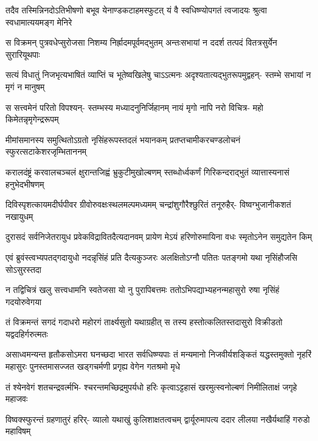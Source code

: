 \twolineshloka
{तदैव तस्मिन्निनदोऽतिभीषणो बभूव येनाण्डकटाहमस्फुटत्}
{यं वै स्वधिष्ण्योपगतं त्वजादयः श्रुत्वा स्वधामात्ययमङ्ग मेनिरे} %

\fourlineindentedshloka
{स विक्रमन् पुत्रवधेप्सुरोजसा}
{निशम्य निर्ह्रादमपूर्वमद्भुतम्}
{अन्तःसभायां न ददर्श तत्पदं}
{वितत्रसुर्येन सुरारियूथपाः} %

\fourlineindentedshloka
{सत्यं विधातुं निजभृत्यभाषितं}
{व्याप्तिं च भूतेष्वखिलेषु चाऽऽत्मनः}
{अदृश्यतात्यद्भुतरूपमुद्वहन्-}
{स्तम्भे सभायां न मृगं न मानुषम्} %

\fourlineindentedshloka
{स सत्त्वमेनं परितो विपश्यन्-}
{स्तम्भस्य मध्यादनुनिर्जिहानम्}
{नायं मृगो नापि नरो विचित्र-}
{महो किमेतन्नृमृगेन्द्ररूपम्} %

\fourlineindentedshloka
{मीमांसमानस्य समुत्थितोऽग्रतो}
{नृसिंहरूपस्तदलं भयानकम्}
{प्रतप्तचामीकरचण्डलोचनं}
{स्फुरत्सटाकेशरजृम्भिताननम्} %

\fourlineindentedshloka
{करालदंष्ट्रं करवालचञ्चलं}
{क्षुरान्तजिह्वं भ्रुकुटीमुखोल्बणम्}
{स्तब्धोर्ध्वकर्णं गिरिकन्दराद्भुतं}
{व्यात्तास्यनासं हनुभेदभीषणम्} %

\fourlineindentedshloka
{दिविस्पृशत्कायमदीर्घपीवर}
{ग्रीवोरुवक्षःस्थलमल्पमध्यमम्}
{चन्द्रांशुगौरैश्छुरितं तनूरुहैर्-}
{विष्वग्भुजानीकशतं नखायुधम्} %

\fourlineindentedshloka
{दुरासदं सर्वनिजेतरायुध}
{प्रवेकविद्रावितदैत्यदानवम्}
{प्रायेण मेऽयं हरिणोरुमायिना}
{वधः स्मृतोऽनेन समुद्यतेन किम्} %

\fourlineindentedshloka
{एवं ब्रुवंस्त्वभ्यपतद्गदायुधो}
{नदन्नृसिंहं प्रति दैत्यकुञ्जरः}
{अलक्षितोऽग्नौ पतितः पतङ्गमो}
{यथा नृसिंहौजसि सोऽसुरस्तदा} %

\fourlineindentedshloka
{न तद्विचित्रं खलु सत्त्वधामनि}
{स्वतेजसा यो नु पुरापिबत्तमः}
{ततोऽभिपद्याभ्यहनन्महासुरो}
{रुषा नृसिंहं गदयोरुवेगया} %

\fourlineindentedshloka
{तं विक्रमन्तं सगदं गदाधरो}
{महोरगं तार्क्ष्यसुतो यथाग्रहीत्}
{स तस्य हस्तोत्कलितस्तदासुरो}
{विक्रीडतो यद्वदहिर्गरुत्मतः} %

\sixlineindentedshloka
{असाध्वमन्यन्त हृतौकसोऽमरा}
{घनच्छदा भारत सर्वधिष्ण्यपाः}
{तं मन्यमानो निजवीर्यशङ्कितं}
{यद्धस्तमुक्तो नृहरिं महासुरः}
{पुनस्तमासज्जत खड्गचर्मणी}
{प्रगृह्य वेगेन गतश्रमो मृधे} %

\fourlineindentedshloka
{तं श्येनवेगं शतचन्द्रवर्त्मभि-}
{श्चरन्तमच्छिद्रमुपर्यधो हरिः}
{कृत्वाऽट्टहासं खरमुत्स्वनोल्बणं}
{निमीलिताक्षं जगृहे महाजवः} %

\fourlineindentedshloka
{विष्वक्स्फुरन्तं ग्रहणातुरं हरिर्-}
{व्यालो यथाखुं कुलिशाक्षतत्वचम्}
{द्वार्यूरुमापत्य ददार लीलया}
{नखैर्यथाहिं गरुडो महाविषम्} %

